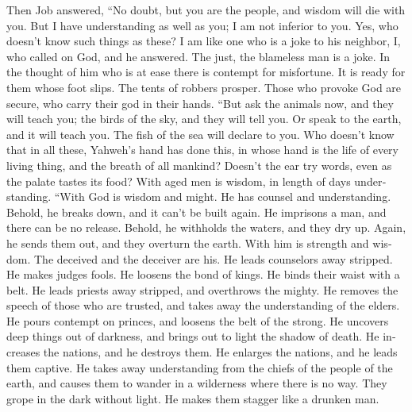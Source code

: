 \begin{paracol}{2}
\begin{otherlanguage}{english}
 Then Job answered,  ``No doubt, but you are
the people, and wisdom will die with you.  But I have
understanding as well as you; I am not inferior to you. Yes, who doesn't
know such things as these?  I am like one who is a joke to
his neighbor, I, who called on God, and he answered. The just, the
blameless man is a joke.  In the thought of him who is at
ease there is contempt for misfortune. It is ready for them whose foot
slips.  The tents of robbers prosper. Those who provoke
God are secure, who carry their god in their hands.  ``But
ask the animals now, and they will teach you; the birds of the sky, and
they will tell you.  Or speak to the earth, and it will
teach you. The fish of the sea will declare to you.  Who
doesn't know that in all these, Yahweh's hand has done this,
 in whose hand is the life of every living thing, and the
breath of all mankind?  Doesn't the ear try words, even
as the palate tastes its food?  With aged men is wisdom,
in length of days understanding.  ``With God is wisdom
and might. He has counsel and understanding.  Behold, he
breaks down, and it can't be built again. He imprisons a man, and there
can be no release.  Behold, he withholds the waters, and
they dry up. Again, he sends them out, and they overturn the earth.
 With him is strength and wisdom. The deceived and the
deceiver are his.  He leads counselors away stripped. He
makes judges fools.  He loosens the bond of kings. He
binds their waist with a belt.  He leads priests away
stripped, and overthrows the mighty.  He removes the
speech of those who are trusted, and takes away the understanding of the
elders.  He pours contempt on princes, and loosens the
belt of the strong.  He uncovers deep things out of
darkness, and brings out to light the shadow of death. 
He increases the nations, and he destroys them. He enlarges the nations,
and he leads them captive.  He takes away understanding
from the chiefs of the people of the earth, and causes them to wander in
a wilderness where there is no way.  They grope in the
dark without light. He makes them stagger like a drunken man.

\end{otherlanguage}


\end{paracol}
